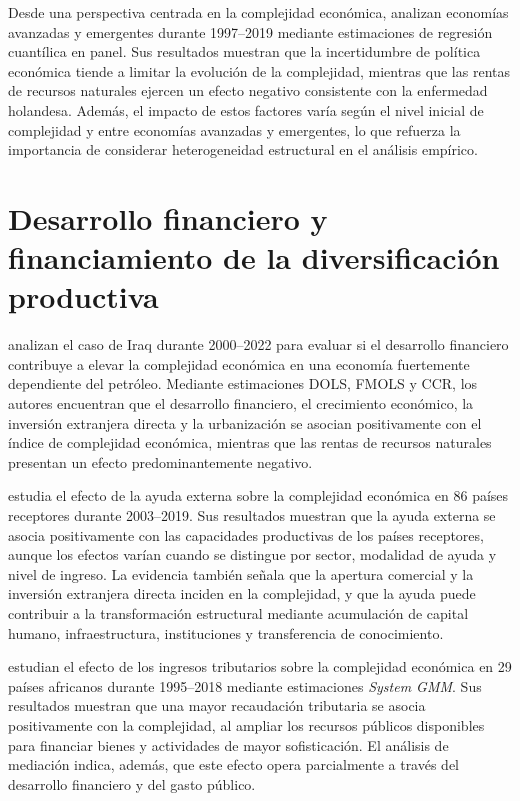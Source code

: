 \documentclass[../../PTFM.tex]{subfiles}
\begin{document}
	Desde una perspectiva centrada en la complejidad económica, \textcite{Hoang2023} analizan economías avanzadas y emergentes durante 1997--2019 mediante estimaciones de regresión cuantílica en panel. Sus resultados muestran que la incertidumbre de política económica tiende a limitar la evolución de la complejidad, mientras que las rentas de recursos naturales ejercen un efecto negativo consistente con la enfermedad holandesa. Además, el impacto de estos factores varía según el nivel inicial de complejidad y entre economías avanzadas y emergentes, lo que refuerza la importancia de considerar heterogeneidad estructural en el análisis empírico.
	
	\section{Desarrollo financiero y financiamiento de la diversificación productiva}
	\label{sec:desarrollo-financiero-diversificacion}

	\textcite{Mayer2023} analizan el caso de Iraq durante 2000--2022 para evaluar si el desarrollo financiero contribuye a elevar la complejidad económica en una economía fuertemente dependiente del petróleo. Mediante estimaciones DOLS, FMOLS y CCR, los autores encuentran que el desarrollo financiero, el crecimiento económico, la inversión extranjera directa y la urbanización se asocian positivamente con el índice de complejidad económica, mientras que las rentas de recursos naturales presentan un efecto predominantemente negativo. 

	\textcite{Arpaci-Ayhan2023} estudia el efecto de la ayuda externa sobre la complejidad económica en 86 países receptores durante 2003--2019. Sus resultados muestran que la ayuda externa se asocia positivamente con las capacidades productivas de los países receptores, aunque los efectos varían cuando se distingue por sector, modalidad de ayuda y nivel de ingreso. La evidencia también señala que la apertura comercial y la inversión extranjera directa inciden en la complejidad, y que la ayuda puede contribuir a la transformación estructural mediante acumulación de capital humano, infraestructura, instituciones y transferencia de conocimiento.

	\textcite{Ndoya2023} estudian el efecto de los ingresos tributarios sobre la complejidad económica en 29 países africanos durante 1995--2018 mediante estimaciones \textit{System GMM}. Sus resultados muestran que una mayor recaudación tributaria se asocia positivamente con la complejidad, al ampliar los recursos públicos disponibles para financiar bienes y actividades de mayor sofisticación. El análisis de mediación indica, además, que este efecto opera parcialmente a través del desarrollo financiero y del gasto público.
	
\end{document}
